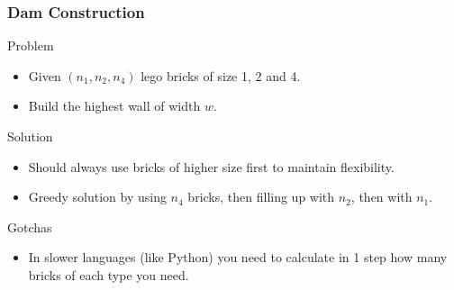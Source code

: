 \documentclass{beamer}
\begin{document}
\begin{frame}
    \frametitle{Dam Construction}
    \begin{block}{Problem}
        \begin{itemize}
            \item Given $(n_1, n_2, n_4)$ lego bricks of size 1, 2 and 4.
            \item Build the highest wall of width $w$.
        \end{itemize}
    \end{block}
    \begin{block}{Solution}
        \begin{itemize}
            \item Should always use bricks of higher size first to maintain flexibility.
            \item Greedy solution by using $n_4$ bricks, then filling up with $n_2$, then with $n_1$.
        \end{itemize}
    \end{block}
    \begin{block}{Gotchas}
        \begin{itemize}
            \item In slower languages (like Python) you need to calculate in 1 step how many bricks of each type you need.
        \end{itemize}
    \end{block}
\end{frame}
\end{document}

